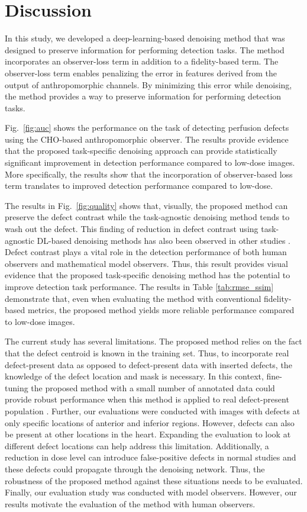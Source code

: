 \documentclass[]{spie}  %
\begin{document}
\section{Discussion}
In this study, we developed a deep-learning-based denoising method that was designed to preserve information for performing detection tasks. The method incorporates an observer-loss term in addition to a fidelity-based term. The observer-loss term enables penalizing the error in features derived from the output of anthropomorphic channels. By minimizing this error while denoising, the method provides a way to preserve information for performing detection tasks.

Fig.~\ref{fig:auc} shows the performance on the task of detecting perfusion defects using the CHO-based anthropomorphic observer. The results provide evidence that the proposed task-specific denoising approach can provide statistically significant improvement in detection performance compared to low-dose images. More specifically, the results show that the incorporation of observer-based loss term translates to improved detection performance compared to low-dose.

The results in Fig.~\ref{fig:quality} shows that, visually, the proposed method can preserve the defect contrast while the task-agnostic denoising method tends to wash out the defect. This finding of reduction in defect contrast using task-agnostic DL-based denoising methods has also been observed in other studies \cite{yu2023ai,ongie2022optimizing}. Defect contrast plays a vital role in the detection performance of both human observers and mathematical model observers. Thus, this result provides visual evidence that the proposed task-specific denoising method has the potential to improve detection task performance. The results in Table \ref{tab:rmse_ssim} demonstrate that, even when evaluating the method with conventional fidelity-based metrics, the proposed method yields more reliable performance compared to low-dose images.

The current study has several limitations. The proposed method relies on the fact that the defect centroid is known in the training set. Thus, to incorporate real defect-present data as opposed to defect-present data with inserted defects, the knowledge of the defect location and mask is necessary. In this context, fine-tuning the proposed method with a small number of annotated data could provide robust performance when this method is applied to real defect-present population \cite{leung2020physics}. Further, our evaluations were conducted with images with defects at only specific locations of anterior and inferior regions. However, defects can also be present at other locations in the heart. Expanding the evaluation to look at different defect locations can help address this limitation. 
Additionally, a reduction in dose level can introduce false-positive defects in normal studies and these defects could propagate through the denoising network. Thus, the robustness of the proposed method against these situations needs to be evaluated.
Finally, our evaluation study was conducted with model observers. However, our results motivate the evaluation of the method with human observers. 
\end{document}
